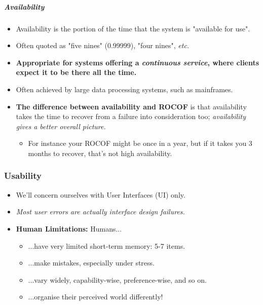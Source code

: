 \documentclass[a4paper]{article}
\providecommand{\tightlist}{%
  \setlength{\itemsep}{0pt}\setlength{\parskip}{0pt}}
\let\oldsubparagraph\subparagraph
\renewcommand{\subparagraph}[1]{\oldsubparagraph{#1}\mbox{}}
\begin{document}
\hypertarget{availability}{%
\subparagraph{Availability}\label{availability}}

\begin{itemize}
\tightlist
\item
  Availability is the portion of the time that the system is "available
  for use".
\item
  Often quoted as "five nines" (0.99999), "four nines", \emph{etc.}
\item
  \textbf{Appropriate for systems offering a \emph{continuous service},
  where clients expect it to be there all the time.}
\item
  Often achieved by large data processing systems, such as mainframes.
\item
  \textbf{The difference between availability and ROCOF} is that
  availability takes the time to recover from a failure into
  consideration too; \emph{availability gives a better overall picture.}

  \begin{itemize}
  \tightlist
  \item
    For instance your ROCOF might be once in a year, but if it takes you
    3 months to recover, that's not high availability.
  \end{itemize}
\end{itemize}

\hypertarget{usability}{%
\subsubsection{Usability}\label{usability}}

\begin{itemize}
\item
  We'll concern ourselves with User Interfaces (UI) only.
\item
  \emph{Most user errors are actually interface design failures.}
\item
  \textbf{Human Limitations:} Humans...

  \begin{itemize}
  \tightlist
  \item
    ...have very limited short-term memory: 5-7 items.
  \item
    ...make mistakes, especially under stress.
  \item
    ...vary widely, capability-wise, preference-wise, and so on.
  \item
    ...organise their perceived world differently!
  \end{itemize}
\end{itemize}
\end{document}
